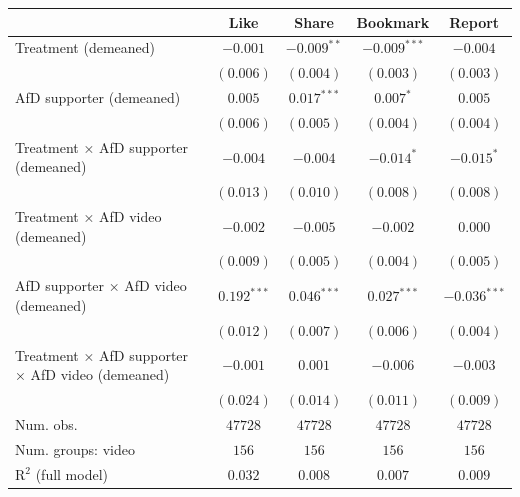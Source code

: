 
\begin{table}
\begin{center}
\begin{tabular}{l c c c c}
\hline
 & Like & Share & Bookmark & Report \\
\hline
Treatment (demeaned)                             & $-0.001$      & $-0.009^{**}$ & $-0.009^{***}$ & $-0.004$       \\
                                                 & $(0.006)$     & $(0.004)$     & $(0.003)$      & $(0.003)$      \\
AfD supporter (demeaned)                         & $0.005$       & $0.017^{***}$ & $0.007^{*}$    & $0.005$        \\
                                                 & $(0.006)$     & $(0.005)$     & $(0.004)$      & $(0.004)$      \\
Treatment × AfD supporter (demeaned)             & $-0.004$      & $-0.004$      & $-0.014^{*}$   & $-0.015^{*}$   \\
                                                 & $(0.013)$     & $(0.010)$     & $(0.008)$      & $(0.008)$      \\
Treatment × AfD video (demeaned)                 & $-0.002$      & $-0.005$      & $-0.002$       & $0.000$        \\
                                                 & $(0.009)$     & $(0.005)$     & $(0.004)$      & $(0.005)$      \\
AfD supporter × AfD video (demeaned)             & $0.192^{***}$ & $0.046^{***}$ & $0.027^{***}$  & $-0.036^{***}$ \\
                                                 & $(0.012)$     & $(0.007)$     & $(0.006)$      & $(0.004)$      \\
Treatment × AfD supporter × AfD video (demeaned) & $-0.001$      & $0.001$       & $-0.006$       & $-0.003$       \\
                                                 & $(0.024)$     & $(0.014)$     & $(0.011)$      & $(0.009)$      \\
\hline
Num. obs.                                        & $47728$       & $47728$       & $47728$        & $47728$        \\
Num. groups: video                               & $156$         & $156$         & $156$          & $156$          \\
R$^2$ (full model)                               & $0.032$       & $0.008$       & $0.007$        & $0.009$        \\

\end{tabular}
\end{center}
\end{table}
